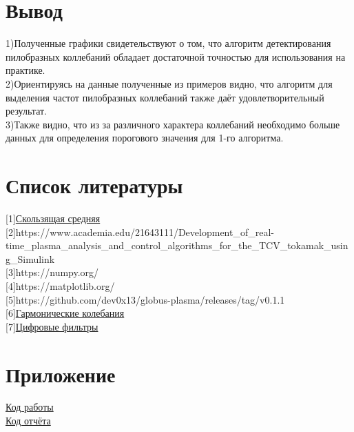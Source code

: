 \documentclass[a4]{article}
\begin{document}
	\section{Вывод}
		1)Полученные графики свидетельствуют о том, что алгоритм детектирования пилобразных коллебаний обладает достаточной точностью для использования на практике.\\
		
		2)Ориентируясь на данные полученные из примеров видно, что алгоритм для выделения частот пилобразных коллебаний также даёт удовлетворительный результат.\\
		
		3)Также видно, что из за различного характера коллебаний необходимо больше данных для определения порогового значения для 1-го алгоритма.
		\newpage
	\section{Список литературы}
	[1]\href{https://ru.wikipedia.org/wiki/%D0%A1%D0%BA%D0%BE%D0%BB%D1%8C%D0%B7%D1%8F%D1%89%D0%B0%D1%8F_%D1%81%D1%80%D0%B5%D0%B4%D0%BD%D1%8F%D1%8F#%D0%9F%D1%80%D0%BE%D1%81%D1%82%D0%BE%D0%B5_%D1%81%D0%BA%D0%BE%D0%BB%D1%8C%D0%B7%D1%8F%D1%89%D0%B5%D0%B5_%D1%81%D1%80%D0%B5%D0%B4%D0%BD%D0%B5%D0%B5}{Скользящая средняя} \\
	
	[2]https://www.academia.edu/21643111/Development\_of\_real-time\_plasma\_analysis\_and\_control\_algorithms\_for\_the\_TCV\_tokamak\_using\_Simulink\\
	
	[3]https://numpy.org/ \\
	
	[4]https://matplotlib.org/ \\
	
	[5]https://github.com/dev0x13/globus-plasma/releases/tag/v0.1.1 \\
	
	[6]\href{https://ru.wikipedia.org/wiki/%D0%93%D0%B0%D1%80%D0%BC%D0%BE%D0%BD%D0%B8%D1%87%D0%B5%D1%81%D0%BA%D0%B8%D0%B5_%D0%BA%D0%BE%D0%BB%D0%B5%D0%B1%D0%B0%D0%BD%D0%B8%D1%8F}{Гармонические колебания} \\

	[7]\href{https://cmi.to/%D1%84%D0%B8%D0%BB%D1%8C%D1%82%D1%80%D1%8B/}{Цифровые фильтры}
		
	\section{Приложение}
	\href{https://github.com/LuciusGen/Matstat/tree/master/Course%20work}{Код работы} \\
		
	\href{https://github.com/LuciusGen/Matstat/blob/master/Course%20work/Salikhov_%D0%9A%D1%83%D1%80%D1%81%D0%BE%D0%B2%D0%B0%D1%8F.tex}{Код отчёта}
	
\end{document}
